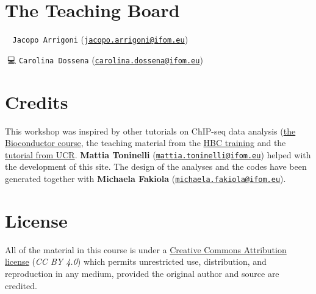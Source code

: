 \documentclass[
]{article}
\begin{document}
\hypertarget{the-teaching-board}{%
\section{The Teaching Board}\label{the-teaching-board}}

🧑🔬 \texttt{Jacopo\ Arrigoni}
(\href{mailto:jacopo.arrigoni@ifom.eu}{\nolinkurl{jacopo.arrigoni@ifom.eu}})

👩💻 \texttt{Carolina\ Dossena}
(\href{mailto:carolina.dossena@ifom.eu}{\nolinkurl{carolina.dossena@ifom.eu}})

\hypertarget{credits}{%
\section{Credits}\label{credits}}

This workshop was inspired by other tutorials on ChIP-seq data analysis
(\href{https://www.bioconductor.org/help/course-materials/2016/CSAMA/lab-5-chipseq/Epigenetics.html}{the
Bioconductor course}, the teaching material from the
\href{https://github.com/hbctraining/Intro-to-ChIPseq/blob/master/schedule/3-day.md}{HBC
training} and the
\href{http://biocluster.ucr.edu/~rkaundal/workshops/R_feb2016/ChIPseq/ChIPseq.html}{tutorial
from UCR}. \textbf{Mattia Toninelli}
(\href{mailto:mattia.toninelli@ifom.eu}{\nolinkurl{mattia.toninelli@ifom.eu}})
helped with the development of this site. The design of the analyses and
the codes have been generated together with \textbf{Michaela Fakiola}
(\href{mailto:michaela.fakiola@ifom.eu}{\nolinkurl{michaela.fakiola@ifom.eu}}).

\hypertarget{license}{%
\section{License}\label{license}}

All of the material in this course is under a
\href{https://creativecommons.org/licenses/by/4.0/}{Creative Commons
Attribution license} (\emph{CC BY 4.0}) which permits unrestricted use,
distribution, and reproduction in any medium, provided the original
author and source are credited.
\end{document}
